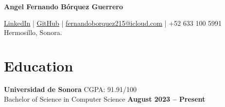 \documentclass[11pt]{article}
\begin{document}
{\Huge \textbf{Angel Fernando Bórquez Guerrero}} \\
\vspace{-0.4cm}
\par \href{https://www.linkedin.com/in/fernandoborquez/}{LinkedIn} \quad | \quad
\href{https://github.com/FernyBoy}{GitHub} \quad | \quad
\href{mailto:fernandoborquez215@icloud.com}{fernandoborquez215@icloud.com} \quad | \quad
+52 633 100 5991 \\
Hermosillo, Sonora.





\section*{Education}
\textbf{Universidad de Sonora} \hfill CGPA: 91.91/100\\
Bachelor of Science in Computer Science \hfill \textbf{August 2023 -- Present}



\end{document}
